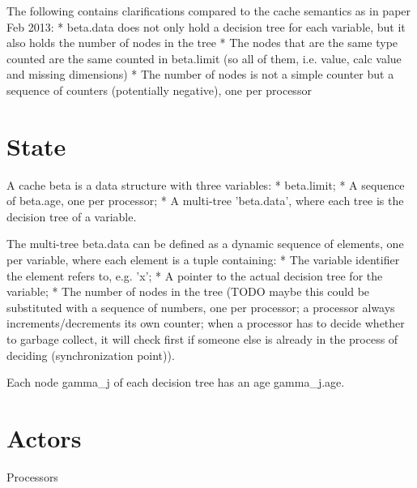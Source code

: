 \documentclass{article}
\begin{document}
The following contains clarifications compared to the cache semantics as in paper Feb 2013:
* beta.data does not only hold a decision tree for each variable, but it also holds the number of nodes in the tree
  * The nodes that are the same type counted are the same counted in beta.limit (so all of them, i.e. value, calc value and missing dimensions)
  * The number of nodes is not a simple counter but a sequence of counters (potentially negative), one per processor

\section{State}
A cache beta is a data structure with three variables:
* beta.limit;
* A sequence of beta.age, one per processor;
* A multi-tree 'beta.data', where each tree is the decision tree of a variable.

The multi-tree beta.data can be defined as a dynamic sequence of elements, one per variable, where each element is a tuple containing:
* The variable identifier the element refers to, e.g. 'x';
* A pointer to the actual decision tree for the variable;
* The number of nodes in the tree (TODO maybe this could be substituted with a sequence of numbers, one per processor; a processor always increments/decrements its own counter; when a processor has to decide whether to garbage collect, it will check first if someone else is already in the process of deciding (synchronization point)).

Each node gamma_j of each decision tree has an age gamma_j.age.

\section{Actors}

Processors
\end{document}
